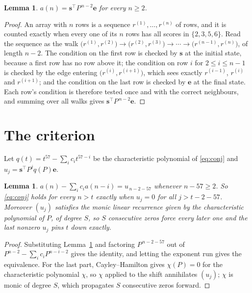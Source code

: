 \documentclass[11pt,a4paper]{article}
\theoremstyle{plain}
\newtheorem{lemma}[theorem]{Lemma}
\theoremstyle{definition}
\begin{document}
\begin{lemma}\label{lem:walk}
$a(n)=\mathbf{s}^{\!\top}P^{\,n-2}\mathbf{e}$ for every $n\ge2$.
\end{lemma}

\begin{proof}
An array with $n$ rows is a sequence $r^{(1)},\dots,r^{(n)}$ of rows, and it is counted
exactly when every one of its $n$ rows has all scores in $\{2,3,5,6\}$. Read the sequence as the
walk $\bigl(r^{(1)},r^{(2)}\bigr)\to\bigl(r^{(2)},r^{(3)}\bigr)\to\cdots\to
\bigl(r^{(n-1)},r^{(n)}\bigr)$, of length $n-2$. The condition on the first row is
checked by $\mathbf{s}$ at the initial state, because a first row has no row above it; the
condition on row $i$ for $2\le i\le n-1$ is checked by the edge entering
$\bigl(r^{(i)},r^{(i+1)}\bigr)$, which sees exactly $r^{(i-1)}$, $r^{(i)}$ and
$r^{(i+1)}$; and the condition on the last row is checked by $\mathbf{e}$ at the final
state. Each row's condition is therefore tested once and with the correct neighbours, and
summing over all walks gives $\mathbf{s}^{\!\top}P^{\,n-2}\mathbf{e}$.
\end{proof}

\section{The criterion}

Let $q(t)=t^{57}-\sum_i c_i t^{57-i}$ be the characteristic polynomial of
\eqref{eq:conj} and $u_j=\mathbf{s}^{\!\top}P^{j}q(P)\mathbf{e}$.

\begin{lemma}\label{lem:crit}
$a(n)-\sum_i c_i a(n-i)=u_{\,n-2-57}$ whenever $n-57\ge2$. So \eqref{eq:conj}
holds for every $n>t$ exactly when $u_j=0$ for all $j>t-2-57$. Moreover $(u_j)$
satisfies the monic linear recurrence given by the characteristic polynomial of $P$, of
degree $S$, so $S$ consecutive zeros force every later one and the last nonzero $u_j$ pins
$t$ down exactly.
\end{lemma}

\begin{proof}
Substituting Lemma~\ref{lem:walk} and factoring $P^{\,n-2-57}$ out of
$P^{n-2}-\sum_i c_i P^{n-i-2}$ gives the identity, and letting the exponent run gives the
equivalence. For the last part, Cayley--Hamilton gives $\chi(P)=0$ for the characteristic
polynomial $\chi$, so $\chi$ applied to the shift annihilates $(u_j)$; $\chi$ is monic of
degree $S$, which propagates $S$ consecutive zeros forward.
\end{proof}
\end{document}
